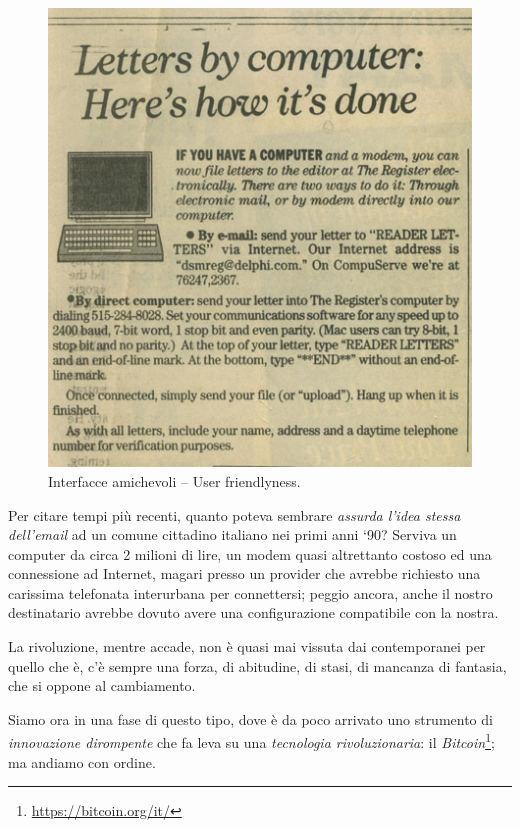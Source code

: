 \documentclass[a4paper,12pt,italian]{article}
\begin{document}
\begin{figure}
\centering
\includegraphics[width=.9\linewidth]{figures/pc_news.jpg}
\caption{Interfacce amichevoli -- User friendlyness.}
\vspace{-10pt}
\end{figure}

Per citare tempi più recenti, quanto poteva sembrare
 \emph{assurda l’idea stessa dell’email} ad un comune cittadino italiano nei
primi anni ‘90? Serviva un computer da circa 2 milioni di lire, un
modem quasi altrettanto costoso ed una connessione ad Internet, magari
presso un provider che avrebbe richiesto una carissima telefonata
interurbana per connettersi; peggio ancora, anche il nostro
destinatario avrebbe dovuto avere una configurazione compatibile con la nostra.
\bigskip

La rivoluzione, mentre accade, non è quasi mai vissuta dai contemporanei per
quello che è, c’è sempre una forza, di abitudine, di stasi, di mancanza
di fantasia, che si oppone al cambiamento.
\bigskip



Siamo ora in una fase di questo tipo, dove è da poco arrivato uno strumento di 
\emph{innovazione dirompente} che fa leva su una \emph{tecnologia rivoluzionaria}:
il \emph{Bitcoin}\footnote{\url{https://bitcoin.org/it/}}; ma andiamo con ordine.
\end{document}
